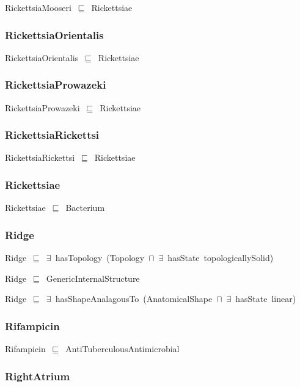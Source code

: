 \documentclass{article}
\begin{document}
RickettsiaMooseri~\ensuremath{\sqsubseteq}~Rickettsiae~

\subsubsection*{RickettsiaOrientalis}

RickettsiaOrientalis~\ensuremath{\sqsubseteq}~Rickettsiae~

\subsubsection*{RickettsiaProwazeki}

RickettsiaProwazeki~\ensuremath{\sqsubseteq}~Rickettsiae~

\subsubsection*{RickettsiaRickettsi}

RickettsiaRickettsi~\ensuremath{\sqsubseteq}~Rickettsiae~

\subsubsection*{Rickettsiae}

Rickettsiae~\ensuremath{\sqsubseteq}~Bacterium~

\subsubsection*{Ridge}

Ridge~\ensuremath{\sqsubseteq}~\ensuremath{\exists}~hasTopology~(Topology~\ensuremath{\sqcap}~\ensuremath{\exists}~hasState~topologicallySolid)~

Ridge~\ensuremath{\sqsubseteq}~GenericInternalStructure~

Ridge~\ensuremath{\sqsubseteq}~\ensuremath{\exists}~hasShapeAnalagousTo~(AnatomicalShape~\ensuremath{\sqcap}~\ensuremath{\exists}~hasState~linear)~

\subsubsection*{Rifampicin}

Rifampicin~\ensuremath{\sqsubseteq}~AntiTuberculousAntimicrobial~

\subsubsection*{RightAtrium}
\end{document}
